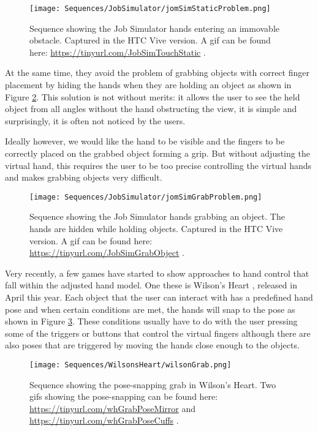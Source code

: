 \begin{figure}[H]
\centering
\texttt{[image: Sequences/JobSimulator/jomSimStaticProblem.png]}
\caption{Sequence showing the Job Simulator hands entering an immovable obstacle. Captured in the HTC Vive version. A gif can be found here: \url{https://tinyurl.com/JobSimTouchStatic} .}
\label{fig:jobSimStaticProblem}
\end{figure}

At the same time, they avoid the problem of grabbing objects with correct finger placement by hiding the hands when they are holding an object as shown in Figure \ref{fig:jobSimGrabProblem}. This solution is not without merits: it allows the user to see the held object from all angles without the hand obstructing the view, it is simple and surprisingly, it is often not noticed by the users.

Ideally however, we would like the hand to be visible and the fingers to be correctly placed on the grabbed object forming a grip. But without adjusting the virtual hand, this requires the user to be too precise controlling the virtual hands and makes grabbing objects very difficult.

\begin{figure}[H]
\centering
\texttt{[image: Sequences/JobSimulator/jomSimGrabProblem.png]}
\caption{Sequence showing the Job Simulator hands grabbing an object. The hands are hidden while holding objects. Captured in the HTC Vive version. A gif can be found here: \url{https://tinyurl.com/JobSimGrabObject} .}
\label{fig:jobSimGrabProblem}
\end{figure}

Very recently, a few games have started to show approaches to hand control that fall within the adjusted hand model. One these is Wilson's Heart \parencite{TwistedPixelGames2017}, released in April this year. Each object that the user can interact with has a predefined hand pose and when certain conditions are met, the hands will snap to the pose as shown in Figure \ref{fig:wilsonGrab}. These conditions usually have to do with the user pressing some of the triggers or buttons that control the virtual fingers although there are also poses that are triggered by moving the hands close enough to the objects.

\begin{figure}[H]
\centering
\texttt{[image: Sequences/WilsonsHeart/wilsonGrab.png]}
\caption{Sequence showing the pose-snapping grab in Wilson's Heart. Two gifs showing the pose-snapping can be found here: \url{https://tinyurl.com/whGrabPoseMirror} and \url{https://tinyurl.com/whGrabPoseCuffs} .}
\label{fig:wilsonGrab}
\end{figure}

